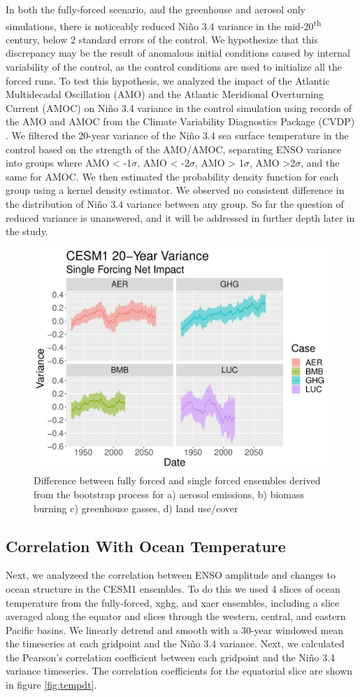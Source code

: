 \documentclass[11pt]{article}
\begin{document}
In both the fully-forced scenario, and the greenhouse and aerosol only simulations, there is noticeably reduced Niño 3.4 variance in the mid-20\textsuperscript{th} century, below 2 standard errors of the control. We hypothesize that this discrepancy may be the result of anomalous initial conditions caused by internal variability of the control, as the control conditions are used to initialize all the forced runs. To test this hypothesis, we analyzed the impact of the Atlantic Multidecadal Oscillation (AMO) and the Atlantic Meridional Overturning Current (AMOC) on Niño 3.4 variance in the control simulation using records of the AMO and AMOC from the Climate Variability Diagnostics Package (CVDP) \citep{phillips2014evaluating}. We filtered the 20-year variance of the Niño 3.4 sea surface temperature in the control based on the strength of the AMO/AMOC, separating ENSO variance into groups where AMO < -1\(\sigma\), AMO < -2\(\sigma\), AMO > 1\(\sigma\), AMO >2\(\sigma\), and the same for AMOC. We then estimated the probability density function for each group using a kernel density estimator. We observed no consistent difference in the distribution of Niño 3.4 variance between any group. So far the question of reduced variance is unanswered, and it will be addressed in further depth later in the study.

\begin{figure}
\centering
\includegraphics[width=.5\linewidth]{../../data/figures/cesm1_sf.pdf}
\caption{\label{fig:bootstrap_1}Difference between fully forced and single forced ensembles derived from the bootstrap process for a) aerosol emissions, b) biomass burning c) greenhouse gasses, d) land use/cover}
\end{figure}

\subsection{Correlation With Ocean Temperature}

Next, we analyzeed the correlation between ENSO amplitude and changes to ocean structure in the CESM1 ensembles. To do this we used 4 slices of ocean temperature from the fully-forced, xghg, and xaer ensembles, including a slice averaged along the equator and slices through the western, central, and eastern Pacific basins. We linearly detrend and smooth with a 30-year windowed mean the timeseries at each gridpoint and the Niño 3.4 variance. Next, we calculated the Pearson's correlation coefficient between each gridpoint and the Niño 3.4 variance timeseries. The correlation coefficients for the equatorial slice are shown in figure \ref{fig:tempdt}.
\end{document}
